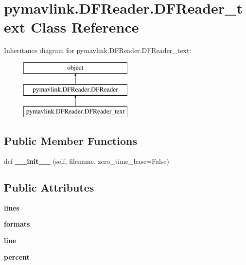 \hypertarget{classpymavlink_1_1DFReader_1_1DFReader__text}{}\section{pymavlink.\+D\+F\+Reader.\+D\+F\+Reader\+\_\+text Class Reference}
\label{classpymavlink_1_1DFReader_1_1DFReader__text}
Inheritance diagram for pymavlink.\+D\+F\+Reader.\+D\+F\+Reader\+\_\+text\+:\begin{figure}[H]
\begin{center}
\leavevmode
\includegraphics[height=3.000000cm]{classpymavlink_1_1DFReader_1_1DFReader__text}
\end{center}
\end{figure}
\subsection*{Public Member Functions}
\begin{DoxyCompactItemize}
\item 
\mbox{\label{classpymavlink_1_1DFReader_1_1DFReader__text_a76e07d046a48e72103c6823ce889c82c}} 
def {\bfseries \+\_\+\+\_\+init\+\_\+\+\_\+} (self, filename, zero\+\_\+time\+\_\+base=False)
\end{DoxyCompactItemize}
\subsection*{Public Attributes}
\begin{DoxyCompactItemize}
\item 
\mbox{\label{classpymavlink_1_1DFReader_1_1DFReader__text_a1c5eb70b7d8eacfbd8a3a5187755d95d}} 
{\bfseries lines}
\item 
\mbox{\label{classpymavlink_1_1DFReader_1_1DFReader__text_ab35c6d78779a3b0f8bd472db02012b15}} 
{\bfseries formats}
\item 
\mbox{\label{classpymavlink_1_1DFReader_1_1DFReader__text_a3d7b847a7d16c3bd1875fe17c7e5659a}} 
{\bfseries line}
\item 
\mbox{\label{classpymavlink_1_1DFReader_1_1DFReader__text_aa93b2a84c631703bcbcffdbdc69898e4}} 
{\bfseries percent}
\end{DoxyCompactItemize}


